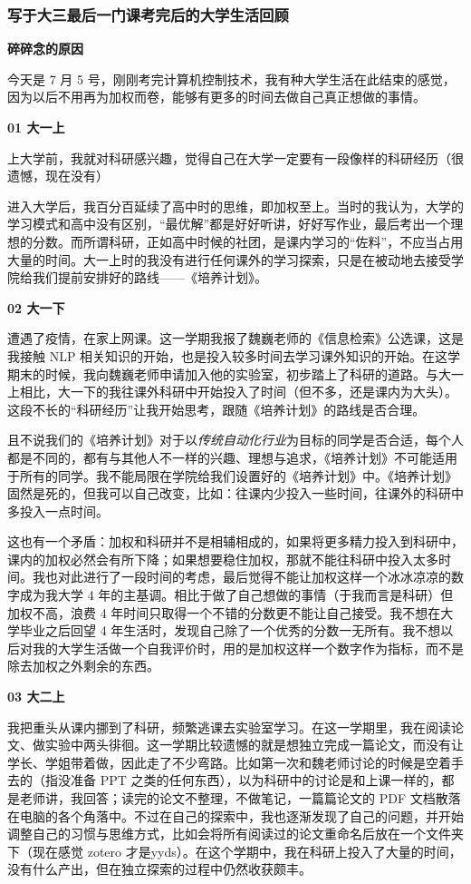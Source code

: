 \subsubsection{写于大三最后一门课考完后的大学生活回顾}

\textbf{碎碎念的原因}

今天是 7 月 5
号，刚刚考完计算机控制技术，我有种大学生活在此结束的感觉，因为以后不用再为加权而卷，能够有更多的时间去做自己真正想做的事情。

\textbf{01 大一上}

上大学前，我就对科研感兴趣，觉得自己在大学一定要有一段像样的科研经历（很遗憾，现在没有）

进入大学后，我百分百延续了高中时的思维，即加权至上。当时的我认为，大学的学习模式和高中没有区别，``最优解''都是好好听讲，好好写作业，最后考出一个理想的分数。而所谓科研，正如高中时候的社团，是课内学习的``佐料''，不应当占用大量的时间。大一上时的我没有进行任何课外的学习探索，只是在被动地去接受学院给我们提前安排好的路线------《培养计划》。

\textbf{02 大一下}

遭遇了疫情，在家上网课。这一学期我报了魏巍老师的《信息检索》公选课，这是我接触
NLP
相关知识的开始，也是投入较多时间去学习课外知识的开始。在这学期末的时候，我向魏巍老师申请加入他的实验室，初步踏上了科研的道路。与大一上相比，大一下的我往课外科研中开始投入了时间（但不多，还是课内为大头）。这段不长的``科研经历''让我开始思考，跟随《培养计划》的路线是否合理。

且不说我们的《培养计划》对于以\emph{传统自动化行业}为目标的同学是否合适，每个人都是不同的，都有与其他人不一样的兴趣、理想与追求，《培养计划》不可能适用于所有的同学。我不能局限在学院给我们设置好的《培养计划》中。《培养计划》固然是死的，但我可以自己改变，比如：往课内少投入一些时间，往课外的科研中多投入一点时间。

这也有一个矛盾：加权和科研并不是相辅相成的，如果将更多精力投入到科研中，课内的加权必然会有所下降；如果想要稳住加权，那就不能往科研中投入太多时间。我也对此进行了一段时间的考虑，最后觉得不能让加权这样一个冰冰凉凉的数字成为我大学
4 年的主基调。相比于做了自己想做的事情（于我而言是科研）但加权不高，浪费
4 年时间只取得一个不错的分数更不能让自己接受。我不想在大学毕业之后回望 4
年生活时，发现自己除了一个优秀的分数一无所有。我不想以后对我的大学生活做一个自我评价时，用的是加权这样一个数字作为指标，而不是除去加权之外剩余的东西。

\textbf{03 大二上}

我把重头从课内挪到了科研，频繁逃课去实验室学习。在这一学期里，我在阅读论文、做实验中两头徘徊。这一学期比较遗憾的就是想独立完成一篇论文，而没有让学长、学姐带着做，因此走了不少弯路。比如第一次和魏老师讨论的时候是空着手去的（指没准备
PPT
之类的任何东西），以为科研中的讨论是和上课一样的，都是老师讲，我回答；读完的论文不整理，不做笔记，一篇篇论文的
PDF
文档散落在电脑的各个角落中。不过在自己的探索中，我也逐渐发现了自己的问题，并开始调整自己的习惯与思维方式，比如会将所有阅读过的论文重命名后放在一个文件夹下（现在感觉
zotero
才是yyds）。在这个学期中，我在科研上投入了大量的时间，没有什么产出，但在独立探索的过程中仍然收获颇丰。

